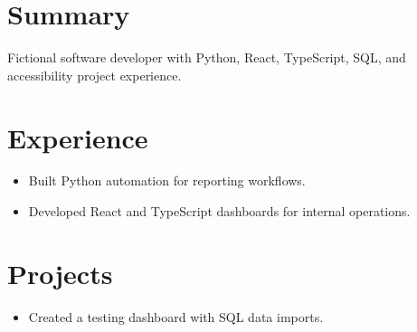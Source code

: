 \documentclass{article}
\begin{document}
\section{Summary}
Fictional software developer with Python, React, TypeScript, SQL, and accessibility project experience.

\section{Experience}
\begin{itemize}
  \item Built Python automation for reporting workflows.
  \item Developed React and TypeScript dashboards for internal operations.
\end{itemize}

\section{Projects}
\begin{itemize}
  \item Created a testing dashboard with SQL data imports.
\end{itemize}
\end{document}
